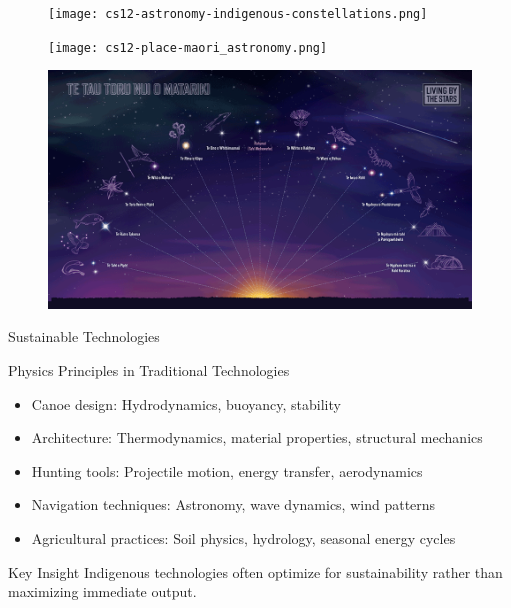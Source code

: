 \documentclass{beamer}
\begin{document}
\begin{frame}
\begin{figure}
    \centering
    \texttt{[image: cs12-astronomy-indigenous-constellations.png]}
\end{figure}
\end{frame}
\begin{frame}{
}
    
\begin{figure}
    \centering
    \texttt{[image: cs12-place-maori\_astronomy.png]}
\end{figure}
\end{frame}
\begin{frame}
\begin{figure}
    \centering
    \includegraphics[width=0.95\linewidth]{../images/cs12-place-maori_astronomy.png}
\end{figure}
\end{frame}


\begin{frame}{Sustainable Technologies}
    \begin{block}{Physics Principles in Traditional Technologies}
        \begin{itemize}
            \item Canoe design: Hydrodynamics, buoyancy, stability
            \item Architecture: Thermodynamics, material properties, structural mechanics
            \item Hunting tools: Projectile motion, energy transfer, aerodynamics
            \item Navigation techniques: Astronomy, wave dynamics, wind patterns
            \item Agricultural practices: Soil physics, hydrology, seasonal energy cycles
        \end{itemize}
    \end{block}
    
    \begin{alertblock}{Key Insight}
        Indigenous technologies often optimize for sustainability rather than maximizing immediate output.
    \end{alertblock}
\end{frame}
\end{document}
